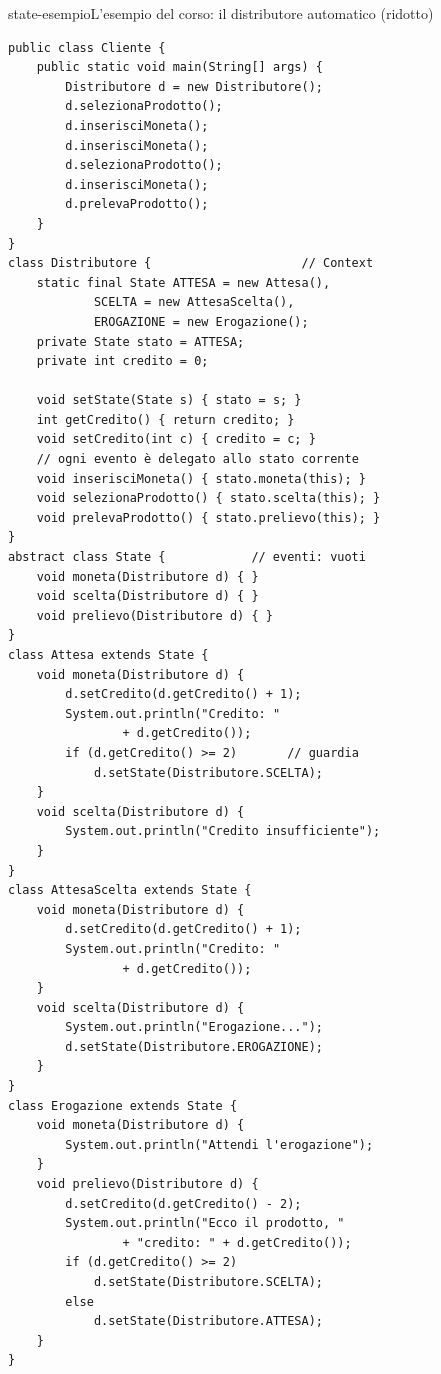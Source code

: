 \begin{programma}{state-esempio}{L'esempio del corso: il distributore automatico (ridotto)}
\begin{lstlisting}[style=javacs, name=Cliente.java]
public class Cliente {
    public static void main(String[] args) {
        Distributore d = new Distributore();
        d.selezionaProdotto();
        d.inserisciMoneta();
        d.inserisciMoneta();
        d.selezionaProdotto();
        d.inserisciMoneta();
        d.prelevaProdotto();
    }
}
class Distributore {                     // Context
    static final State ATTESA = new Attesa(),
            SCELTA = new AttesaScelta(),
            EROGAZIONE = new Erogazione();
    private State stato = ATTESA;
    private int credito = 0;

    void setState(State s) { stato = s; }
    int getCredito() { return credito; }
    void setCredito(int c) { credito = c; }
    // ogni evento è delegato allo stato corrente
    void inserisciMoneta() { stato.moneta(this); }
    void selezionaProdotto() { stato.scelta(this); }
    void prelevaProdotto() { stato.prelievo(this); }
}
abstract class State {            // eventi: vuoti
    void moneta(Distributore d) { }
    void scelta(Distributore d) { }
    void prelievo(Distributore d) { }
}
class Attesa extends State {
    void moneta(Distributore d) {
        d.setCredito(d.getCredito() + 1);
        System.out.println("Credito: "
                + d.getCredito());
        if (d.getCredito() >= 2)       // guardia
            d.setState(Distributore.SCELTA);
    }
    void scelta(Distributore d) {
        System.out.println("Credito insufficiente");
    }
}
class AttesaScelta extends State {
    void moneta(Distributore d) {
        d.setCredito(d.getCredito() + 1);
        System.out.println("Credito: "
                + d.getCredito());
    }
    void scelta(Distributore d) {
        System.out.println("Erogazione...");
        d.setState(Distributore.EROGAZIONE);
    }
}
class Erogazione extends State {
    void moneta(Distributore d) {
        System.out.println("Attendi l'erogazione");
    }
    void prelievo(Distributore d) {
        d.setCredito(d.getCredito() - 2);
        System.out.println("Ecco il prodotto, "
                + "credito: " + d.getCredito());
        if (d.getCredito() >= 2)
            d.setState(Distributore.SCELTA);
        else
            d.setState(Distributore.ATTESA);
    }
}
\end{lstlisting}
\tcblower
{}
\end{programma}
